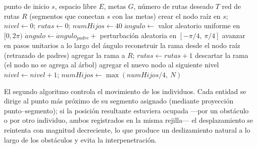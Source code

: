 \documentclass[12pt,a4paper]{article}
\begin{document}
\begin{algorithm}[H]
\caption{Generación de la red de rutas (crecimiento inspirado en hongos).}
\begin{algorithmic}[1]
\Require punto de inicio $s$, espacio libre $E$, metas $G$, número de rutas deseado $T$
\Ensure red de rutas $R$ (segmentos que conectan $s$ con las metas)
\State crear el nodo raíz en $s$; $nivel \gets 0$; $rutas \gets 0$; $numHijos \gets 40$
                \State $\acute{a}ngulo \gets$ valor aleatorio uniforme en $[0, 2\pi)$
            \Else
                \State $\acute{a}ngulo \gets \acute{a}ngulo_{padre} +$ perturbaci\'on aleatoria en $[-\pi/4,\ \pi/4]$
            \EndIf
            \State avanzar en pasos unitarios a lo largo del \'angulo
                \State reconstruir la rama desde el nodo ra\'iz (retrazado de padres)
                \State agregar la rama a $R$; $rutas \gets rutas + 1$
                 \State \Return \EndIf
                \State descartar la rama (el nodo no se agrega al \'arbol)
            \Else
                \State agregar el nuevo nodo al siguiente nivel
            \EndIf
        \EndFor
    \EndFor
    \State $nivel \gets nivel + 1$; $numHijos \gets \max(numHijos/4,\ N)$
\EndWhile
\end{algorithmic}
\end{algorithm}

El segundo algoritmo controla el movimiento de los individuos. Cada entidad se dirige al punto más próximo de su segmento asignado (mediante proyección punto--segmento); si la posición resultante estuviera ocupada —por un obstáculo o por otro individuo, ambos registrados en la misma rejilla— el desplazamiento se reintenta con magnitud decreciente, lo que produce un deslizamiento natural a lo largo de los obstáculos y evita la interpenetración.
\end{document}
